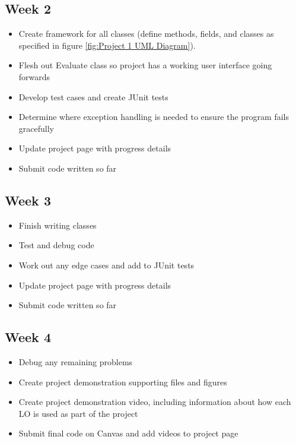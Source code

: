 \documentclass{article}
\begin{document}
\subsection{Week 2}
\begin{itemize}
	\item Create framework for all classes (define methods, fields, and classes as specified in figure \ref{fig:Project 1 UML Diagram}).
	\item Flesh out Evaluate class so project has a working user interface going forwards
	\item Develop test cases and create JUnit tests
	\item Determine where exception handling is needed to ensure the program fails gracefully
	\item Update project page with progress details
	\item Submit code written so far
\end{itemize}
\subsection{Week 3}
\begin{itemize}
	\item Finish writing classes
	\item Test and debug code
	\item Work out any edge cases and add to JUnit tests
	\item Update project page with progress details
	\item Submit code written so far
\end{itemize}
\subsection{Week 4}
\begin{itemize}
	\item Debug any remaining problems
	\item Create project demonstration supporting files and figures
	\item Create project demonstration video, including information about how each LO is used as part of the project
	\item Submit final code on Canvas and add videos to project page
\end{itemize}
\end{document}
